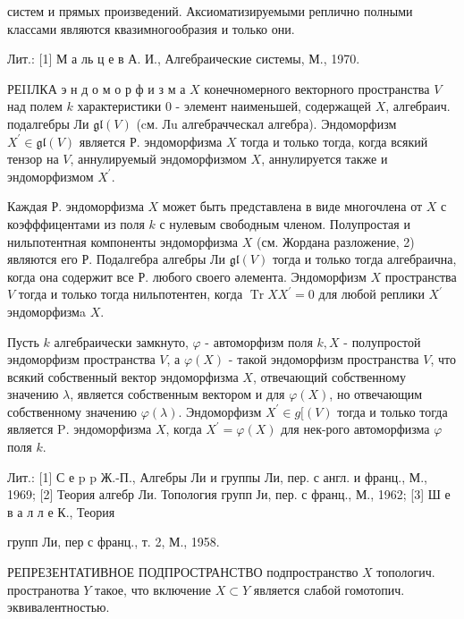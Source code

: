 \documentclass[10pt]{article}
\begin{document}
систем и прямых произведений. Аксиоматизируемыми реплично полными классами являются квазимногообразия и только они.



Лит.: [1] М а ль ц е в А. И., Алгебраические системы, М., 1970.



РЕIIЛКА э н д о м о р ф и з м а $X$ конечномерного векторного пространства $V$ над полем $k$ характеристики 0 - элемент наименьшей, содержащей $X$, алгебраич. подалгебры Ли $\mathfrak{g l}(V)$ (cм. Лu алгебрачческал алгебра). Эндоморфизм $X^{\prime} \in \mathfrak{g l}(V)$ является Р. эндоморфизма $X$ тогда и только тогда, когда всякий тензор на $V$, аннулируемый эндоморфизмом $X$, аннулируется также и эндоморфизмом $X^{\prime}$.



Каждая Р. эндоморфизма $X$ может быть представлена в виде многочлена от $X$ с коэфффицентами из поля $k$ с нулевым свободным членом. Полупростая и нильпотентная компоненты эндоморфизма $X$ (см. Жордана разложение, 2) являются его Р. Подалгебра алгебры Ли $\mathfrak{g l}(V)$ тогда и только тогда алгебраична, когда она содержит все Р. любого своего әлемента. Эндоморфизм $X$ пространства $V$ тогда и только тогда нильпотентен, когда $\operatorname{Tr} X X^{\prime}=0$ для любой реплики $X^{\prime}$ эндоморфизмa $X$.



Пусть $k$ алгебраически замкнуто, $\varphi$ - автоморфизм поля $k, X$ - полупростой эндоморфизм пространства $V$, а $\varphi(X)$ - такой эндоморфизм пространства $V$, что всякий собственный вектор эндоморфизма $X$, отвечающий собственному значению $\lambda$, является собственным вектором и для $\varphi(X)$, но отвечающим собственному значению $\varphi(\lambda)$. Эндоморфизм $X^{\prime} \in g[(V)$ тогда и только тогда является $\mathrm{P}$. эндоморфизма $X$, когда $X^{\prime}=\varphi(X)$ для нек-рого автоморфизма $\varphi$ поля $k$.



Лит.: [1] С е p p Ж.-П., Алгебры Ли и группы Ли, пер. с англ. и франц., М., 1969; [2] Теория алгебр Ли. Топология групп Ји, пер. с франц., М., 1962; [3] Ш е в а л л е К., Теория

групп Ли, пер с франц., т. 2, М., 1958.



РЕПРЕЗЕНТАТИВНОЕ ПОДПРОСТРАНСТВО подпространство $X$ топологич. пространотва $Y$ такое, что включение $X \subset Y$ является слабой гомотопич. эквивалентностью.
\end{document}
